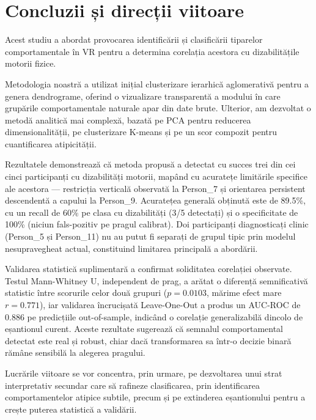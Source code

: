 \documentclass[12pt,a4paper]{report}
\theoremstyle{definition}
\theoremstyle{remark}
\begin{document}





\chapter{Concluzii și direcții viitoare}

Acest studiu a abordat provocarea identificării și clasificării tiparelor comportamentale în VR pentru a determina corelația acestora cu dizabilitățile motorii fizice.

Metodologia noastră a utilizat inițial clusterizare ierarhică aglomerativă pentru a genera dendrograme, oferind o vizualizare transparentă a modului în care grupările comportamentale naturale apar din date brute. Ulterior, am dezvoltat o metodă analitică mai complexă, bazată pe PCA pentru reducerea dimensionalității, pe clusterizare K-means și pe un scor compozit pentru cuantificarea atipicității.

Rezultatele demonstrează că metoda propusă a detectat cu succes trei din cei cinci participanți cu dizabilități motorii, mapând cu acuratețe limitările specifice ale acestora — restricția verticală observată la Person\_7 și orientarea persistent descendentă a capului la Person\_9. Acuratețea generală obținută este de 89.5\%, cu un recall de 60\% pe clasa cu dizabilități (3/5 detectați) și o specificitate de 100\% (niciun fals-pozitiv pe pragul calibrat). Doi participanți diagnosticați clinic (Person\_5 și Person\_11) nu au putut fi separați de grupul tipic prin modelul nesupravegheat actual, constituind limitarea principală a abordării.

Validarea statistică suplimentară a confirmat soliditatea corelației observate. Testul Mann-Whitney U, independent de prag, a arătat o diferență semnificativă statistic între scorurile celor două grupuri ($p = 0.0103$, mărime efect mare $r = 0.771$), iar validarea încrucișată Leave-One-Out a produs un AUC-ROC de 0.886 pe predicțiile out-of-sample, indicând o corelație generalizabilă dincolo de eșantionul curent. Aceste rezultate sugerează că semnalul comportamental detectat este real și robust, chiar dacă transformarea sa într-o decizie binară rămâne sensibilă la alegerea pragului.

Lucrările viitoare se vor concentra, prin urmare, pe dezvoltarea unui strat interpretativ secundar care să rafineze clasificarea, prin identificarea comportamentelor atipice subtile, precum și pe extinderea eșantionului pentru a crește puterea statistică a validării.
\end{document}
